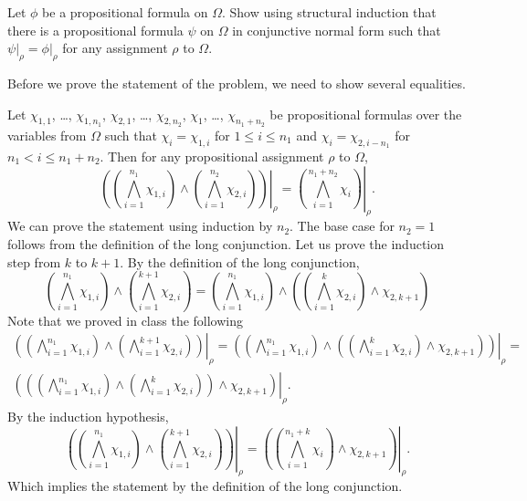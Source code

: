 \documentclass[addpoints]{exam}
\begin{document}
\begin{questions}
\begin{parts}
				Let $\phi$ be a propositional formula on $\Omega$. Show using structural induction
				that there is a propositional formula $\psi$ on $\Omega$ in conjunctive normal
				form such that $\psi\big\rvert_\rho = \phi\big\rvert_\rho$ for any
				assignment $\rho$ to $\Omega$.
            \begin{solution}[\stretch{1}]
              Before we prove the statement of the problem, we need to show several equalities.

Let $\chi_{1, 1}$, \dots, $\chi_{1, n_1}$,
$\chi_{2, 1}$, \dots, $\chi_{2, n_2}$, $\chi_1$, \dots, $\chi_{n_1 + n_2}$ be
propositional formulas  over the variables from $\Omega$ such that
$\chi_i = \chi_{1, i}$ for $1 \le i \le n_1$ and $\chi_i = \chi_{2, i - n_1}$
for $n_1 < i \le n_1 + n_2$.
Then for any propositional assignment $\rho$ to $\Omega$,
\[
    \left.\left(
        \left(\bigwedge_{i = 1}^{n_1} \chi_{1, i}\right) \land
        \left(\bigwedge_{i = 1}^{n_2} \chi_{2, i}\right)
    \right)\right\rvert_\rho =
    \left.\left(
        \bigwedge_{i = 1}^{n_1 + n_2} \chi_{i}
    \right)\right\rvert_\rho.
\]
We can prove the statement using induction by $n_2$. The base case for $n_2 = 1$
follows from the definition of the long conjunction.
Let us prove the induction step from $k$ to $k + 1$.
By the definition of the long conjunction,
\[
    \left(\bigwedge_{i = 1}^{n_1} \chi_{1, i}\right) \land
    \left(\bigwedge_{i = 1}^{k + 1} \chi_{2, i}\right)
    =
    \left(\bigwedge_{i = 1}^{n_1} \chi_{1, i}\right) \land
    \left(
        \left(\bigwedge_{i = 1}^k \chi_{2, i}\right) \land
        \chi_{2, k + 1}
    \right)
\]
Note that we proved in class the following
\begin{multline*}
    \left.\left(
        \left(\bigwedge_{i = 1}^{n_1} \chi_{1, i}\right) \land
        \left(\bigwedge_{i = 1}^{k + 1} \chi_{2, i}\right)
    \right)\right\rvert_\rho
    =
    \left.\left(
        \left(\bigwedge_{i = 1}^{n_1} \chi_{1, i}\right) \land
        \left(
            \left(\bigwedge_{i = 1}^k \chi_{2, i}\right) \land
            \chi_{2, k + 1}
        \right)
    \right)\right\rvert_\rho
    = \\
    \left.\left(
        \left(
            \left(\bigwedge_{i = 1}^{n_1} \chi_{1, i}\right) \land
            \left(\bigwedge_{i = 1}^k \chi_{2, i}\right)
        \right) \land
        \chi_{2, k + 1}
    \right)\right\rvert_\rho.
\end{multline*}
By the induction hypothesis,
\[
    \left.\left(
        \left(\bigwedge_{i = 1}^{n_1} \chi_{1, i}\right) \land
        \left(\bigwedge_{i = 1}^{k + 1} \chi_{2, i}\right)
    \right)\right\rvert_\rho
    =
    \left.\left(
        \left(
            \bigwedge_{i = 1}^{n_1 + k} \chi_{i}
        \right) \land
        \chi_{2, k + 1}
    \right)\right\rvert_\rho.
\]
Which implies the statement by the definition of the long conjunction.


\end{solution}
\end{parts}
\end{questions}
\end{document}
